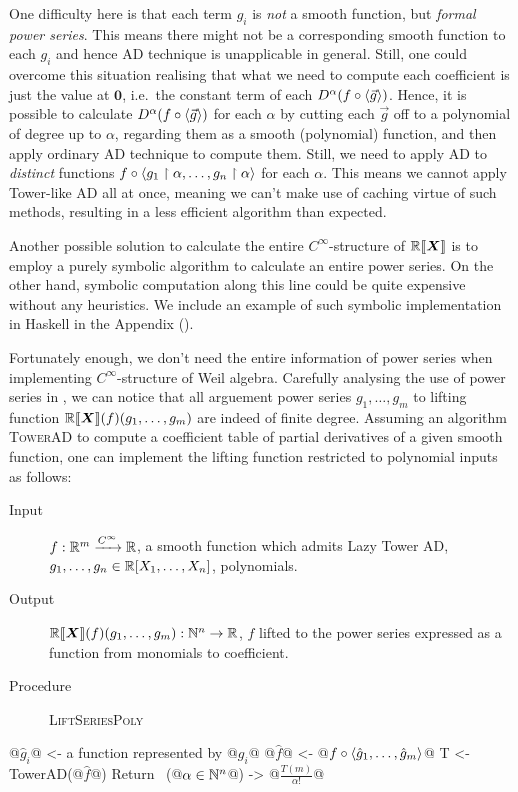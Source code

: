\documentclass[%
  sigconf,authorversion,screen]{acmart}
\begin{document}
One difficulty here is that each term $g_i$ is \emph{not} a smooth function, but \emph{formal power series}.
This means there might not be a corresponding smooth function to each $g_i$ and hence AD technique is unapplicable in general.
Still, one could overcome this situation realising that what we need to compute each coefficient is just the value at $\boldsymbol{0}$, i.e.\ the constant term of each $D^\alpha(f\circ\braket{\vec{g}})$.
Hence, it is possible to calculate $D^\alpha(f\circ\braket{\vec{g}})$ for each $\alpha$ by cutting each $\vec{g}$ off to a polynomial of degree up to $\alpha$, regarding them as a smooth (polynomial) function, and then apply ordinary AD technique to compute them.
Still, we need to apply AD to \emph{distinct} functions $f \circ \braket{g_1 \upharpoonright \alpha, \dots, g_n \upharpoonright \alpha}$ for each $\alpha$.
This means we cannot apply Tower-like AD all at once, meaning we can't make use of caching virtue of such methods, resulting in a less efficient algorithm than expected.

Another possible solution to calculate the entire $C^\infty$-structure of $\mathord{\mathbb{R}\llbracket\boldsymbol{X}\rrbracket}$ is to employ a purely symbolic algorithm to calculate an entire power series.
On the other hand, symbolic computation along this line could be quite expensive without any heuristics.
We include an example of such symbolic implementation in Haskell in the Appendix ().

Fortunately enough, we don't need the entire information of power series when implementing $C^\infty$-structure of Weil algebra.
Carefully analysing the use of power series in , we can notice that all arguement power series $g_1, \dots, g_m$ to lifting function $\mathord{\mathbb{R}\llbracket\boldsymbol{X}\rrbracket}(f)(g_1, \dots, g_m)$ are indeed of finite degree.
Assuming an algorithm \textsc{TowerAD} to compute a coefficient table of partial derivatives of a given smooth function, one can implement the lifting function restricted to polynomial inputs as follows:

\begin{algorithm}\label{alg:lift-poly-series}
\hfill\vspace{-.25em}
\begin{description}
  \item[Input]
    $f: \mathbb{R}^m \xrightarrow{C^\infty} \mathbb{R}$, a smooth function which admits Lazy Tower AD,
    $g_1, \dots, g_n \in \mathbb{R}[X_1, \dots, X_n]$, polynomials.
  \item[Output] $\mathord{\mathbb{R}\llbracket\boldsymbol{X}\rrbracket}(f)(g_1, \dots, g_m): \mathbb{N}^n \to \mathbb{R}$, $f$ lifted to the power series expressed as a function from monomials to coefficient.
  \item[Procedure] \textup{\textsc{LiftSeriesPoly}}
\end{description}
\begin{alg}
@$\hat{g}_i$@ <- a function represented by @$g_i$@
@$\hat{f}$@ <- @$f \circ \braket{\hat{g}_1, \dots, \hat{g}_m}$@
T <- TowerAD(@$\hat f$@)
Return \ (@$\alpha \in \mathbb{N}^n$@) -> @$\frac{T(m)}{\alpha!}$@
\end{alg}
\end{algorithm}
\end{document}
